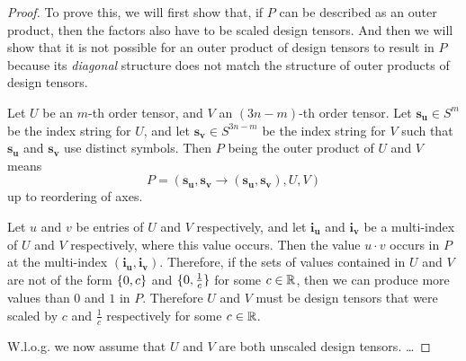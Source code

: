 \begin{proof}
    \small
    To prove this, we will first show that, if $P$ can be described as an outer product, then the factors also have to be scaled design tensors.
    And then we will show that it is not possible for an outer product of design tensors to result in $P$ because its \textit{diagonal} structure does not match the structure of outer products of design tensors.

    Let $U$ be an $m$-th order tensor, and $V$ an $(3n-m)$-th order tensor.
    Let $\bm{s_u} \in S^{m}$ be the index string for $U$,
    and let $\bm{s_v} \in S^{3n - m}$ be the index string for $V$ such that $\bm{s_u}$ and $\bm{s_v}$ use distinct symbols.
    Then $P$ being the outer product of $U$ and $V$ means
    $$P = (\bm{s_u}, \bm{s_v} \rightarrow (\bm{s_u}, \bm{s_v}), U, V)$$
    up to reordering of axes.

    Let $u$ and $v$ be entries of $U$ and $V$ respectively, and let $\bm{i_u}$ and $\bm{i_v}$ be a multi-index of $U$ and $V$ respectively, where this value occurs.
    Then the value $u \cdot v$ occurs in $P$ at the multi-index $(\bm{i_u}, \bm{i_v})$.
    Therefore, if the sets of values contained in $U$ and $V$ are not of the form $\lbrace 0, c \rbrace$ and $\lbrace 0, \frac{1}{c} \rbrace$ for some $c \in \mathbb{R}$, then we can produce more values than $0$ and $1$ in $P$.
    Therefore $U$ and $V$ must be design tensors that were scaled by $c$ and $\frac{1}{c}$ respectively for some $c \in \mathbb{R}$.

    W.l.o.g. we now assume that $U$ and $V$ are both unscaled design tensors.
    \dots
\end{proof}